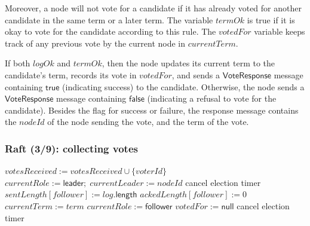 Moreover, a node will not vote for a candidate if it has already voted for another candidate in the same term or a later term.
The variable $\mathit{termOk}$ is true if it is okay to vote for the candidate according to this rule.
The $\mathit{votedFor}$ variable keeps track of any previous vote by the current node in $\mathit{currentTerm}$.

If both $\mathit{logOk}$ and $\mathit{termOk}$, then the node updates its current term to the candidate's term, records its vote in $\mathit{votedFor}$, and sends a $\mathsf{VoteResponse}$ message containing $\mathsf{true}$ (indicating success) to the candidate.
Otherwise, the node sends a $\mathsf{VoteResponse}$ message containing $\mathsf{false}$ (indicating a refusal to vote for the candidate).
Besides the flag for success or failure, the response message contains the $\mathit{nodeId}$ of the node sending the vote, and the term of the vote.

\begin{frame}
    \label{s:raft3}
    \frametitle{Raft (3/9): collecting votes}
    \footnotesize
    \begin{algorithmic}
        \State
                \State $\mathit{votesReceived} := \mathit{votesReceived} \cup \{\mathit{voterId}\}$
                    \State $\mathit{currentRole} := \mathsf{leader};\; \mathit{currentLeader} := \mathit{nodeId}$
                    \State cancel election timer
                        \State $\mathit{sentLength}[\mathit{follower}] := \mathit{log}.\mathsf{length}$
                        \State $\mathit{ackedLength}[\mathit{follower}] := 0$
                        \State {}
                    \EndFor
                \EndIf
                \State $\mathit{currentTerm} := \mathit{term}$
                \State $\mathit{currentRole} := \mathsf{follower}$
                \State $\mathit{votedFor} := \mathsf{null}$
                \State cancel election timer
            \EndIf
        \EndOn
        \State
    \end{algorithmic}
\end{frame}
\label{l:raft3}

